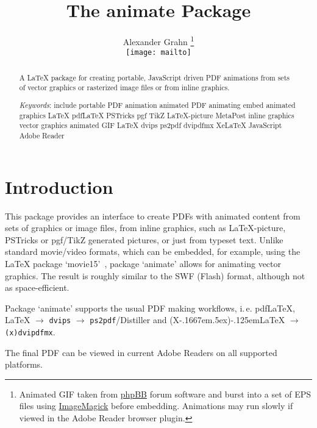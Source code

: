 \documentclass[a4paper]{article}
\def\keywords{include portable PDF animation animated PDF animating embed animated graphics LaTeX pdfLaTeX PSTricks pgf TikZ LaTeX-picture MetaPost inline graphics vector graphics animated GIF LaTeX dvips ps2pdf dvipdfmx XeLaTeX JavaScript Adobe Reader}
\def\pXepLaTeX{(X\kern-.1667em\lower.5ex\hbox{\reflectbox{E}})\kern-.125em\LaTeX}
\begin{document}
\title{The {\sffamily animate} Package}
\author{Alexander Grahn \protect\footnote{Animated GIF taken from \href{http://www.phpBB.com}{phpBB} forum software and burst into a set of EPS files using \href{http://www.imagemagick.org}{ImageMagick} before embedding. Animations may run slowly if viewed in the Adobe Reader browser plugin.}\\[1ex]\texttt{[image: mailto]}}
\maketitle

\begin{abstract}
\raggedright

\noindent A LaTeX package for creating portable, JavaScript driven PDF animations from sets of vector graphics or rasterized image files or from inline graphics.
\baselineskip

\emph{Keywords}: \keywords
\end{abstract}

\tableofcontents

\section{Introduction}
This package provides an interface to create PDFs with animated content from sets of graphics or image files, from inline graphics, such as \LaTeX-picture, PSTricks or pgf/TikZ generated pictures, or just from typeset text. Unlike standard movie/video formats, which can be embedded, for example, using the \LaTeX{} package `movie15'~\cite{movie15}, package `animate' allows for animating vector graphics. The result is roughly similar to the SWF (Flash) format, although not as space-efficient.

Package `animate' supports the usual PDF making workflows, i.\,e. pdf\LaTeX{}, \LaTeX{} $\rightarrow$ \verb+dvips+ $\rightarrow$ \verb+ps2pdf+/Distiller and \pXepLaTeX{} $\rightarrow$ \verb+(x)dvipdfmx+.

The final PDF can be viewed in current Adobe Readers on all supported platforms.

\end{document}
